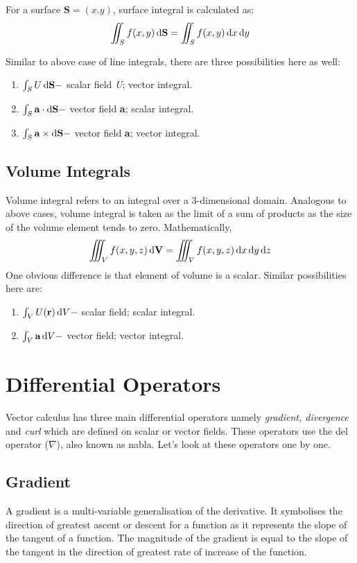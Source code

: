 For a surface $\textbf{S} = (x.y)$, surface integral is calculated as:
\begin{equation}
\iint_{S} f(x,y)\mathop{}\!\mathrm{d} \textbf{S} = \iint_{S} f(x,y)\mathop{}\!\mathrm{d} x \mathop{}\!\mathrm{d} y
\end{equation}

Similar to above case of line integrals, there are three possibilities here as well:

\begin{enumerate}
	\item $ \int_{S} U \mathop{}\!\mathrm{d} \textbf{S}-$ scalar field \textit{U}; vector integral.
	\item $ \int_{S} \textbf{a} \cdot \mathop{}\!\mathrm{d} \textbf{S}-$ vector field \textbf{a}; scalar integral.
	\item $ \int_{S} \textbf{a} \times \mathop{}\!\mathrm{d} \textbf{S}-$ vector field \textbf{a}; vector integral.
\end{enumerate}

\subsection{Volume Integrals}
Volume integral refers to an integral over a 3-dimensional domain. Analogous to above cases, volume integral is taken as the limit of a sum of products as the size of the volume element tends to zero. Mathematically,
\begin{equation}
	\iiint_{V} f(x,y,z) \mathop{}\!\mathrm{d} \textbf{V} = \iiint_{V} f(x,y,z) \mathop{}\!\mathrm{d} x \mathop{}\!\mathrm{d} y \mathop{}\!\mathrm{d} z
\end{equation}
One obvious difference is that element of volume is a scalar. Similar possibilities here are:
\begin{enumerate}
	\item $ \int_{V} U(\textbf{r}) \mathop{}\!\mathrm{d} V -$ scalar field; scalar integral.
	\item $ \int_{V} \textbf{a} \mathop{}\!\mathrm{d} V -$ vector field; vector integral.
\end{enumerate}

\section{Differential Operators}
Vector calculus has three main differential operators namely \textit{gradient, divergence} and \textit{curl} which are defined on scalar or vector fields. These operators use the del operator ($\nabla$), also known as nabla. Let's look at these operators one by one.

\subsection{Gradient}
A gradient is a multi-variable generalisation of the derivative. It symbolises the direction of greatest ascent or descent for a function as it represents the slope of the tangent of a function. The magnitude of the gradient is equal to the slope of the tangent in the direction of greatest rate of increase of the function.

